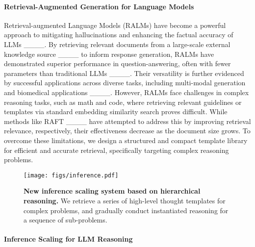 \paragraph{Retrieval-Augmented Generation for Language Models}
Retrieval-augmented Language Models (RALMs) have become a powerful approach to mitigating hallucinations and enhancing the factual accuracy of LLMs ____. By retrieving relevant documents from a large-scale external knowledge source ____ to inform response generation, RALMs have demonstrated superior performance in question-answering, often with fewer parameters than traditional LLMs ____. Their versatility is further evidenced by successful applications across diverse tasks, including multi-modal generation and biomedical applications ____.  However, RALMs face challenges in complex reasoning tasks, such as math and code, where retrieving relevant guidelines or templates via standard embedding similarity search proves difficult. While methods like RAFT ____ have attempted to address this by improving retrieval relevance, respectively, their effectiveness decrease as the document size grows.  To overcome these limitations, we design a structured and compact template library for efficient and accurate retrieval, specifically targeting complex reasoning problems.




    

\begin{figure*}[tp]
    \centering
    \texttt{[image: figs/inference.pdf]}
    \caption{\textbf{New inference scaling system based on hierarchical reasoning.} We retrieve a series of high-level thought templates for complex problems, and gradually conduct instantiated reasoning for a sequence of sub-problems. }
    \vspace{-0.2in}
    \label{pic-inference}
\end{figure*}


\paragraph{Inference Scaling for LLM Reasoning}





